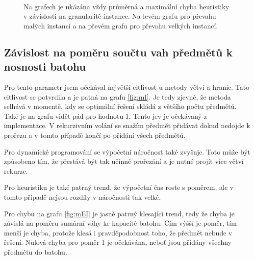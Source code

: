 \documentclass[11pt]{article}
\begin{document}
\begin{figure}
\begin{minipage}[c]{0.49\textwidth}
    \end{minipage}
    \\
   \caption{Na grafech je ukázána vždy průměrná a maximální chyba heuristiky v závislosti na granularitě instance. Na levém grafu pro převahu malých instancí a na převém grafu pro převahu velkých instancí.}\label{fig:GOEI}
    \end{figure} 
    
\subsection{Závislost na poměru součtu vah předmětů k nosnosti batohu}
Pro tento parametr jsem očekával největší citlivost u metody větví a hranic. Tato citlivost se potvrdila a je patná na grafu \ref{fig:mI}. Je tedy zjevné, že metoda selhává v momentě, kdy se optimální řešení skládá z většího počtu předmětů. Také je na grafu vidět pád pro hodnotu 1. Tento jev je očekávaný z implementace. V rekurzivním volání se snažím předmět přidávat dokud nedojde k prořezu a v tomto případě končí po přidání všech předmětů.

Pro dynamické programování se výpočetní náročnost také zvyšuje. Toto může být způsobeno tím, že přestává být tak učínné prořezání a je nutné projít více větví rekurze.

Pro heuristiku je také patrný trend, že výpočetní čas roste s poměrem, ale v tomto případě nejsou rozdíly v náročnosti tak velké.

Pro chybu na grafu \ref{fig:mEI} je jasně patrný klesající trend, tedy že chyba je závislá na poměru sumární váhy ke kapacitě batohu. Čím výšší je poměr, tím menší je chyba, protože klesá i pravděpodobnost toho, že předmět nebude v řešení. Nulová chyba pro poměr 1 je očekávána, neboť jsou přídány všechny předmětu do batohu.
\end{document}
